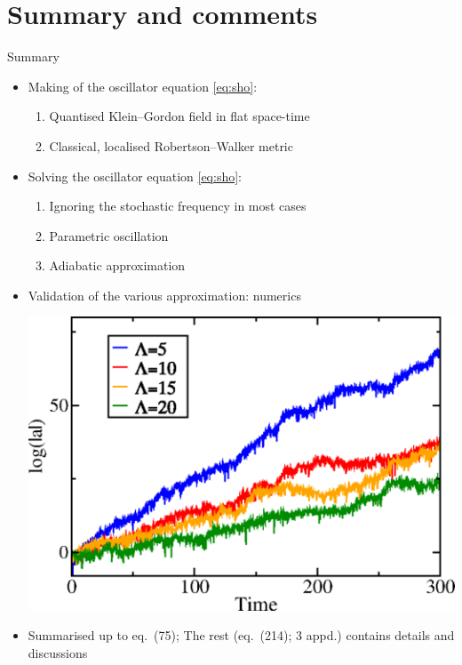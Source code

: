 \documentclass{beamer}
\begin{document}
\section{Summary and comments}

\begin{frame}{Summary}

\begin{itemize}
\item Making of the oscillator equation \cref{eq:sho}:
\begin{enumerate}
\item Quantised Klein--Gordon field in flat space-time
\item Classical, localised Robertson--Walker metric
\end{enumerate}
\item Solving  the oscillator equation \cref{eq:sho}:
\begin{enumerate}
\item Ignoring the stochastic frequency in most cases
\item Parametric oscillation
\item Adiabatic approximation
\end{enumerate}
\item Validation of the various approximation: numerics \cite{Wang2017}
\begin{center}
\includegraphics[width=.5\linewidth]{./graphics/FIG.4.png}
\end{center}
\item Summarised up to eq.~(75); The rest (eq.~(214); 3 appd.) contains 
details and discussions
\end{itemize}
  
\end{frame}
\end{document}
